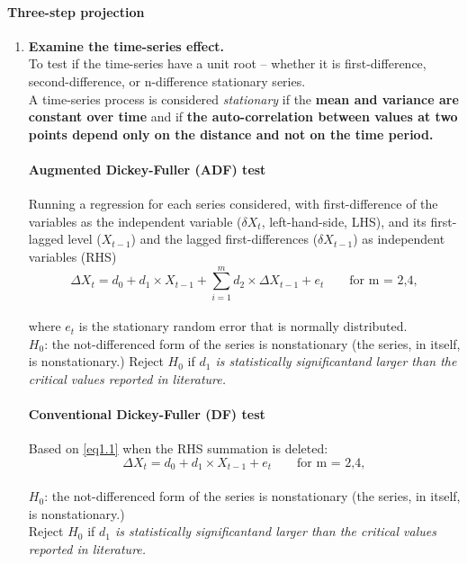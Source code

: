 \paragraph{Three-step projection}{
	\begin{enumerate}
		\item \textbf{Examine the time-series effect. }\\
		To test if the time-series have a unit root -- whether it is first-difference, second-difference, or n-difference stationary series.\\
		\small {A time-series process is considered \textit{stationary} if the \textbf{mean and variance are constant over time} and if \textbf{the auto-correlation between values at two points depend only on the distance and not on the time period.}}\\
		\paragraph{Augmented Dickey-Fuller (ADF) test}{
			Running a regression for each series considered, with first-difference of the variables as the independent variable ($\delta X_t$, left-hand-side, LHS), and its first-lagged level ($X_{t-1}$) and the lagged first-differences ($\delta X_{t-1}$) as independent variables (RHS)
			\begin{equation}\label{eq1.1}
				\Delta X_t = d_0 + d_1 \times X_{t-1} + \sum_{i=1}^{m} d_2 \times \Delta X_{t-1} + e_t \qquad \text{for m = 2,4},
			\end{equation}
			}\\
		where $e_t$ is the stationary random error that is normally distributed. \\
		$H_0$: the not-differenced form of the series is nonstationary (the series, in itself, is nonstationary.)
		Reject $H_0$ if \textit{$d_1$ is statistically significantand larger than the critical values reported in literature. }
	
		\paragraph{Conventional Dickey-Fuller (DF) test}{
			Based on \cref{eq1.1} when the RHS summation is deleted:
			\begin{equation}\label{eq1.2}
				\Delta X_t = d_0 + d_1 \times X_{t-1} + e_t \qquad \text{for m = 2,4},
			\end{equation}
			}\\
		$H_0$: the not-differenced form of the series is nonstationary (the series, in itself, is nonstationary.)\\
		Reject $H_0$ if \textit{$d_1$ is statistically significantand larger than the critical values reported in literature. }\\
		

\end{enumerate}}
